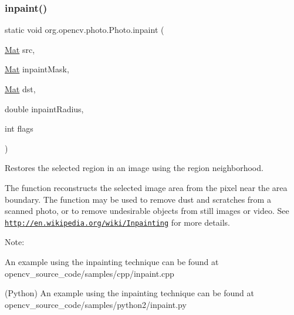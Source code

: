\subsubsection{\texorpdfstring{inpaint()}{inpaint()}}
{\footnotesize\ttfamily static void org.\+opencv.\+photo.\+Photo.\+inpaint (\begin{DoxyParamCaption}\item[{\mbox{\hyperlink{classorg_1_1opencv_1_1core_1_1_mat}{Mat}}}]{src,  }\item[{\mbox{\hyperlink{classorg_1_1opencv_1_1core_1_1_mat}{Mat}}}]{inpaint\+Mask,  }\item[{\mbox{\hyperlink{classorg_1_1opencv_1_1core_1_1_mat}{Mat}}}]{dst,  }\item[{double}]{inpaint\+Radius,  }\item[{int}]{flags }\end{DoxyParamCaption})\hspace{0.3cm}{\ttfamily [static]}}

Restores the selected region in an image using the region neighborhood.

The function reconstructs the selected image area from the pixel near the area boundary. The function may be used to remove dust and scratches from a scanned photo, or to remove undesirable objects from still images or video. See \href{http://en.wikipedia.org/wiki/Inpainting}{\tt http\+://en.\+wikipedia.\+org/wiki/\+Inpainting} for more details.

Note\+:


\begin{DoxyItemize}
\item An example using the inpainting technique can be found at opencv\+\_\+source\+\_\+code/samples/cpp/inpaint.\+cpp 
\item (Python) An example using the inpainting technique can be found at opencv\+\_\+source\+\_\+code/samples/python2/inpaint.\+py 
\end{DoxyItemize}


